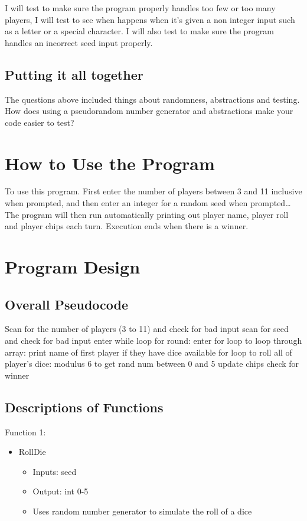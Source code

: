 \documentclass{article}
\begin{document}
I will test to make sure the program properly handles too few or too many players, I will test to see when happens when it's given a non integer input such as a letter or a special character. I will also test to make sure the program handles an incorrect seed input properly.

\subsection{Putting it all together}

The questions above included things about randomness, abstractions and testing. How does using a pseudorandom number generator and abstractions make your code easier to test?


\section{How to Use the Program}

To use this program. First enter the number of players between 3 and 11 inclusive when prompted, and then enter an integer for a random seed when prompted… The program will then run automatically printing out player name, player roll and player chips each turn. Execution ends when there is a winner.

\section{Program Design}

\subsection{Overall Pseudocode}

Scan for the number of players (3 to 11) and check for bad input
scan for seed and check for bad input
enter while loop for round:
	enter for loop to loop through array:
		print name of first player if they have dice available
		for loop to roll all of player's dice:
			modulus 6 to get rand num between 0 and 5
			update chips
		check for winner

\subsection{Descriptions of Functions}

Function 1:
\begin{itemize}
	\item RollDie
	\begin{itemize}
		\item Inputs: seed
		\item Output: int 0-5
		\item Uses random number generator to simulate the roll of a dice
	\end{itemize}
\end{itemize}
\end{document}
